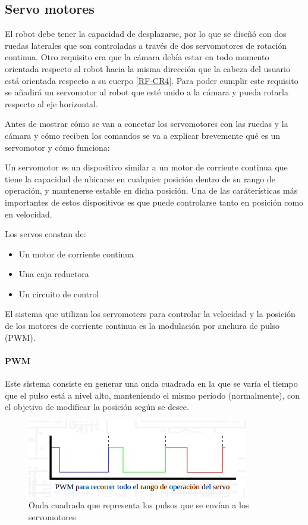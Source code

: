 \documentclass[twoside, 11pt]{epstfg}
\begin{document}
\subsection{Servo motores}
El robot debe tener la capacidad de desplazarse, por lo que se diseñó con dos ruedas laterales que son controladas a través de dos servomotores de rotación continua. Otro requisito era que la cámara debía estar en todo momento orientada respecto al robot hacia la misma dirección que la cabeza del usuario está orientada respecto a su cuerpo \ref{RF-CR4}. Para poder cumplir este requisito se añadirá un servomotor al robot que esté unido a la cámara y pueda rotarla respecto al eje horizontal.

Antes de mostrar cómo se van a conectar los servomotores con las ruedas y la cámara y cómo reciben los comandos se va a explicar brevemente qué es un servomotor y cómo funciona:

Un servomotor es un dispositivo similar a un motor de corriente continua que tiene la capacidad de ubicarse en cualquier posición dentro de su rango de operación, y mantenerse estable en dicha posición. Una de las caráterísticas más importantes de estos dispositivos es que puede controlarse tanto en posición como en velocidad.


Los servos constan de:
\begin{itemize}
	\item Un motor de corriente continua
	\item Una caja reductora
	\item Un circuito de control
\end{itemize}

El sistema que utilizan los servomoters para controlar la velocidad y la posición de los motores de corriente continua es la modulación por anchura de pulso (PWM).

\paragraph{PWM}

Este sistema consiste en generar una onda cuadrada en la que se varía el tiempo que el pulso está a nivel alto, manteniendo el mismo período (normalmente), con el objetivo de modificar la posición según se desee.

\begin{figure}[h]
	\centerline{
		\mbox{\includegraphics[width=.80\textwidth]{images/ondaServo.png}}
	}
	\caption{Onda cuadrada que representa los pulsos que se envían a los servomotores}
\end{figure}
\end{document}
